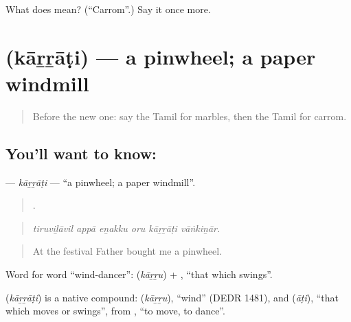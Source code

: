 \begin{tcolorbox}[breakable,colback=teal!4,colframe=teal!35!black,title={Before you move on}]
What does  mean? (\textquotedblleft{}Carrom\textquotedblright{}.) Say it once more.
\end{tcolorbox}
\section[\texorpdfstring{\ta{காற்றாடி} (kāṟṟāṭi)}{காற்றாடி (kāṟṟāṭi)}]{ (kāṟṟāṭi) — a pinwheel; a paper windmill}

\label{lesson:TA-C530-karrati}



\begin{quote}
Before the new one: say the Tamil for marbles, then the Tamil for carrom.
\end{quote}

\subsection*{You'll want to know: }
\textbf{} — \emph{kāṟṟāṭi} — \textquotedblleft{}a pinwheel; a paper windmill\textquotedblright{}.

\begin{quote}
     .
\end{quote}

\begin{quote}
\emph{tiruviḻāvil appā eṉakku oru kāṟṟāṭi vāṅkiṉār.}
\end{quote}

\begin{quote}
At the festival Father bought me a pinwheel.
\end{quote}

Word for word \textquotedblleft{}wind-dancer\textquotedblright{}:  (\emph{kāṟṟu}) + , \textquotedblleft{}that which swings\textquotedblright{}.

\begin{cousinweb}
\textbf{} (\emph{kāṟṟāṭi}) is a native compound:  (\emph{kāṟṟu}), \textquotedblleft{}wind\textquotedblright{} (DEDR 1481), and  (\emph{āṭi}), \textquotedblleft{}that which moves or swings\textquotedblright{}, from , \textquotedblleft{}to move, to dance\textquotedblright{}.
\end{cousinweb}

